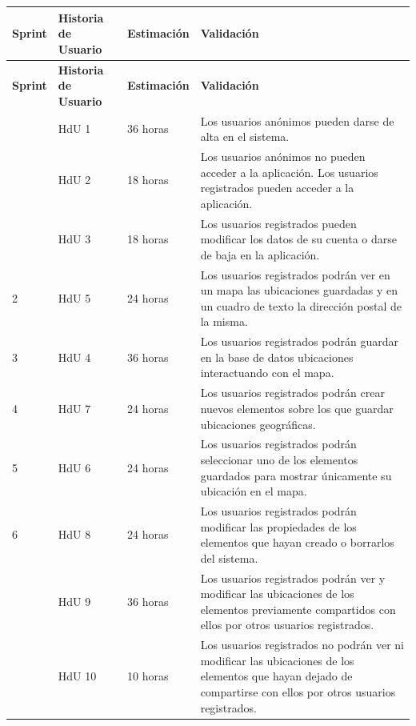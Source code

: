 \begin{longtable}{p{1cm} p{4cm} p{3cm} p{7cm}}
  	\hline  	    
  	\multicolumn{1}{p{1cm}}{\cellcolor{black!30}\textbf{Sprint}} &
    \multicolumn{1}{p{4cm}}{\cellcolor{black!30}\textbf{Historia de Usuario}} & 
 	\multicolumn{1}{p{3cm}}{\cellcolor{black!30}\textbf{Estimación}} &
 	\multicolumn{1}{p{7cm}}{\cellcolor{black!30}\textbf{Validación}}
 	\\
 	\toprule 
   	\endfirsthead
	     
    \hline
  	\multicolumn{1}{p{1cm}}{\cellcolor{black!30}\textbf{Sprint}} &
    \multicolumn{1}{p{4cm}}{\cellcolor{black!30}\textbf{Historia de Usuario}} & 
 	\multicolumn{1}{p{3cm}}{\cellcolor{black!30}\textbf{Estimación}} &
 	\multicolumn{1}{p{7cm}}{\cellcolor{black!30}\textbf{Validación}}
 	\\	 
 	\toprule
 	\endhead

	\rowcolor{gray!25}
	\multirow{3}{*}{1}	& HdU 1	&	36 horas	&	Los usuarios anónimos pueden darse de alta en el sistema. \\ 
	\rowcolor{gray!25}	& HdU 2	&	18 horas	&	Los usuarios anónimos no pueden acceder a la aplicación. Los usuarios registrados 														pueden acceder a la aplicación. \\ 
	\rowcolor{gray!25}	& HdU 3	&	18 horas	&	Los usuarios registrados pueden modificar los datos de su cuenta o darse de baja en 														la aplicación.  \\                      
	
	2	& HdU 5		&	24 horas	&	Los usuarios registrados podrán ver en un mapa las ubicaciones guardadas y en un cuadro de 												texto la dirección postal de la misma.\\
	\rowcolor{gray!25}
	3	& HdU 4		&	36 horas	&	Los usuarios registrados podrán guardar en la base de datos ubicaciones 																	interactuando con el mapa. \\
	
	4	& HdU 7		&	24 horas	&	Los usuarios registrados podrán crear nuevos elementos sobre los que guardar ubicaciones 													geográficas. \\
	\rowcolor{gray!25}
	5	& HdU 6		&	24 horas	&	Los usuarios registrados podrán seleccionar uno de los elementos 																			guardados para mostrar únicamente su ubicación en el mapa. \\

	6	& HdU 8		&	24 horas	&	Los usuarios registrados podrán modificar las propiedades de los elementos que hayan creado o 											borrarlos del sistema. \\
	\rowcolor{gray!25}
	\multirow{2}{*}{7}	& HdU 9		&	36 horas	&	Los usuarios registrados podrán ver y modificar las ubicaciones de los elementos 															previamente compartidos con ellos por otros usuarios registrados. \\
	\rowcolor{gray!25}	& HdU 10	&	10 horas	&	Los usuarios registrados no podrán ver ni modificar las ubicaciones de los 																elementos que hayan dejado de compartirse con ellos por otros usuarios 																	registrados. \\


\end{longtable}
